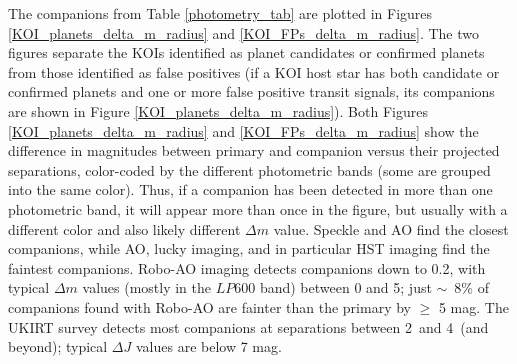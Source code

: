 \documentclass[twocolumn,appendixfloats]{aastex6}
\begin{document}
The companions from Table \ref{photometry_tab} are plotted in Figures
\ref{KOI_planets_delta_m_radius} and \ref{KOI_FPs_delta_m_radius}. 
The two figures separate the KOIs identified as planet candidates or
confirmed planets from those identified as false positives (if a KOI host
star has both candidate or confirmed planets and one or more false
positive transit signals, its companions are shown in Figure 
\ref{KOI_planets_delta_m_radius}). Both Figures \ref{KOI_planets_delta_m_radius} 
and \ref{KOI_FPs_delta_m_radius} show the difference in magnitudes 
between primary and companion versus their projected separations, 
color-coded by the different photometric bands (some are grouped into 
the same color). Thus, if a companion has been detected in more than 
one photometric band, it will appear more than once in the figure, but 
usually with a different color and also likely different $\Delta m$ value.
Speckle and AO find the closest companions, while AO, lucky imaging, 
and in particular HST imaging find the faintest companions. Robo-AO
imaging detects companions down to 0.2\arcsec, with typical $\Delta m$ 
values (mostly in the $LP600$ band) between 0 and 5; just $\sim$~8\%
of companions found with Robo-AO are fainter than the primary by 
$\geq$ 5 mag. 
The UKIRT survey detects most companions at separations between 
2\arcsec\ and 4\arcsec\ (and beyond); typical $\Delta J$ values are 
below 7 mag.  
\end{document}
